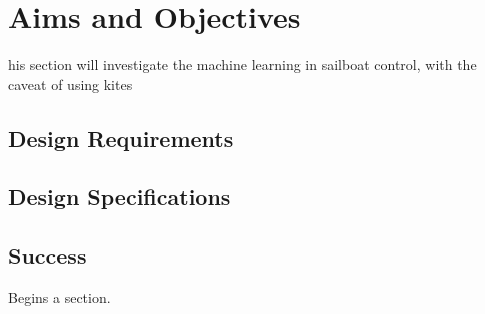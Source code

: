 
%
\let\textcircled=\pgftextcircled
\chapter{Aims and Objectives}
\label{chap:aims_and_opjectives}

his section will investigate the machine learning in sailboat control, with the caveat of using kites

\section{Design Requirements}

\section{Design Specifications}

\section{Success}
\label{sec:sec01}

Begins a section.



